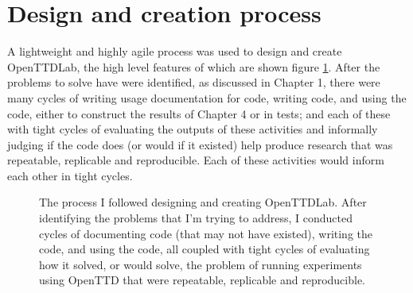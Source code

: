 \documentclass[logo,msc,dsti]{infthesis}    %
\begin{document}
{\section{Design and creation process}

A lightweight and highly agile process was used to design and create OpenTTDLab, the high level features of which are shown figure \ref{fig:solo-agile}. After the problems to solve have were identified, as discussed in Chapter 1, there were many cycles of writing usage documentation for code, writing code, and using the code, either to construct the results of Chapter 4 or in tests; and each of these with tight cycles of evaluating the outputs of these activities and informally judging if the code does (or would if it existed) help produce research that was repeatable, replicable and reproducible. Each of these activities would inform each other in tight cycles.

\begin{figure}[h]
\centering
{}
\caption{The process I followed designing and creating OpenTTDLab. After identifying the problems that I'm trying to address, I conducted cycles of documenting code (that may not have existed), writing the code, and using the code, all coupled with tight cycles of evaluating how it solved, or would solve, the problem of running experiments using OpenTTD that were repeatable, replicable and reproducible.}
\label{fig:solo-agile}
\end{figure}

}
\end{document}
